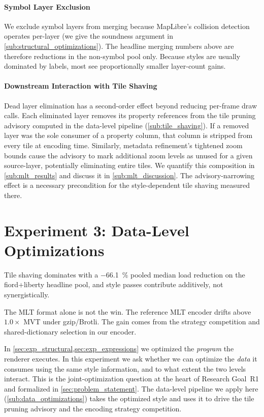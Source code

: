 \paragraph{Symbol Layer Exclusion}
We exclude symbol layers from merging because MapLibre's collision detection operates per-layer (we give the soundness argument in \cref{sub:structural_optimizations}).
The headline merging numbers above are therefore reductions in the non-symbol pool only.
Because styles are usually dominated by labels, most see proportionally smaller layer-count gains.

\paragraph{Downstream Interaction with Tile Shaving}
Dead layer elimination has a second-order effect beyond reducing per-frame draw calls.
Each eliminated layer removes its property references from the tile pruning advisory computed in the data-level pipeline (\cref{sub:tile_shaving}).
If a removed layer was the sole consumer of a property column, that column is stripped from every tile at encoding time.
Similarly, metadata refinement's tightened zoom bounds cause the advisory to mark additional zoom levels as unused for a given source-layer, potentially eliminating entire tiles.
We quantify this composition in \cref{sub:mlt_results} and discuss it in \cref{sub:mlt_discussion}. The advisory-narrowing effect is a necessary precondition for the style-dependent tile shaving measured there.


\section{Experiment 3: Data-Level Optimizations}\label{sec:exp_mlt}
\begin{keytakeaways}
\item Tile shaving dominates with a \qty{-66.1}{\percent} pooled median load reduction on the fiord+liberty headline pool, and style passes contribute additively, not synergistically.
\item The \ac{MLT} format alone is not the win.
The reference \ac{MLT} encoder drifts above $1.0\times$ \ac{MVT} under gzip/Brotli.\newline
    The gain comes from the strategy competition and shared-dictionary selection in our encoder.
\end{keytakeaways}

\noindent In \cref{sec:exp_structural,sec:exp_expressions} we optimized the \emph{program} the renderer executes.
In this experiment we ask whether we can optimize the \emph{data} it consumes using the same style information, and to what extent the two levels interact.
This is the joint-optimization question at the heart of Research Goal~R1 and formalized in \cref{sec:problem_statement}.
The data-level pipeline we apply here (\cref{sub:data_optimizations}) takes the optimized style and uses it to drive the tile pruning advisory and the encoding strategy competition.


